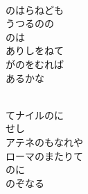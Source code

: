 \documentclass[10pt,b5j]{tarticle} %
\begin{document}
\vspace{1.5em} %
\newcommand{\linespace}{0.5em} %
\newcommand{\blocksize}{0.5\hsize} %
\newcommand{\itemmargin}{3em} %
\begin{enumerate} %
    \setlength{\itemindent}{\itemmargin} %
    \begin{minipage}[c]{\blocksize}
    
        \vspace{\linespace}
        \item~\\
        のはらねども\\
        うつるのの\\
        のは\\
        ありしをねて\\
        がのをむれば\\
        あるかな
        
    \end{minipage}
    \begin{minipage}[c]{\blocksize}
        
        \vspace{\linespace}
        \item~\\
        てナイルのに\\
        せし\\
        アテネのもなれや\\
        ローマのまたりて\\
        のに\\
        のぞなる
        
    \end{minipage}
    \begin{minipage}[c]{\blocksize}
        

\end{minipage}
\end{enumerate}
\end{document}
